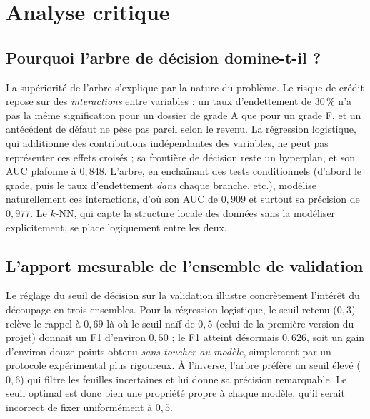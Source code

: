 
\section{Analyse critique}
\label{sec:analyse}

\subsection{Pourquoi l'arbre de décision domine-t-il ?}

La supériorité de l'arbre s'explique par la nature du problème. Le risque de
crédit repose sur des \emph{interactions} entre variables : un taux
d'endettement de $30\,\%$ n'a pas la même signification pour un dossier de
grade A que pour un grade F, et un antécédent de défaut ne pèse pas pareil
selon le revenu. La régression logistique, qui additionne des contributions
indépendantes des variables, ne peut pas représenter ces effets croisés ; sa
frontière de décision reste un hyperplan, et son AUC plafonne à $0{,}848$.
L'arbre, en enchaînant des tests conditionnels (d'abord le grade, puis le taux
d'endettement \emph{dans} chaque branche, etc.), modélise naturellement ces
interactions, d'où son AUC de $0{,}909$ et surtout sa précision de
$0{,}977$. Le $k$-NN, qui capte la structure locale des données sans la
modéliser explicitement, se place logiquement entre les deux.

\subsection{L'apport mesurable de l'ensemble de validation}

Le réglage du seuil de décision sur la validation illustre concrètement
l'intérêt du découpage en trois ensembles. Pour la régression logistique, le
seuil retenu ($0{,}3$) relève le rappel à $0{,}69$ là où le seuil naïf de
$0{,}5$ (celui de la première version du projet) donnait un F1 d'environ
$0{,}50$ ; le F1 atteint désormais $0{,}626$, soit un gain d'environ douze
points obtenu \emph{sans toucher au modèle}, simplement par un protocole
expérimental plus rigoureux. À l'inverse, l'arbre préfère un seuil élevé
($0{,}6$) qui filtre les feuilles incertaines et lui donne sa précision
remarquable. Le seuil optimal est donc bien une propriété propre à chaque
modèle, qu'il serait incorrect de fixer uniformément à $0{,}5$.

